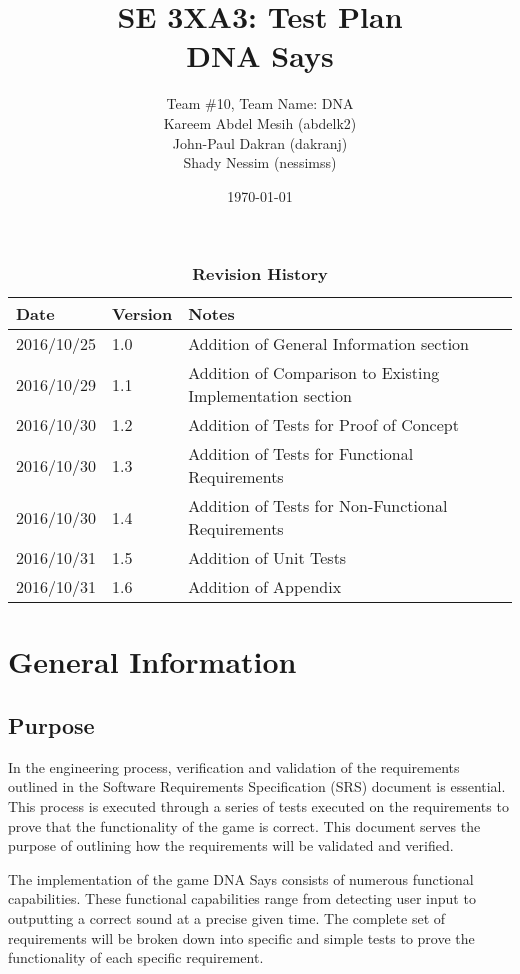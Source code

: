 \documentclass[12pt, titlepage]{article}
\title{SE 3XA3: Test Plan\\DNA Says}
\author{Team \#10, Team Name: DNA
		\\ Kareem Abdel Mesih (abdelk2)
		\\ John-Paul Dakran (dakranj)
		\\ Shady Nessim (nessimss)
}
\date{\today}
\begin{document}
\maketitle
{}
\tableofcontents
\listoftables
\listoffigures
\begin{table}[bp]
\caption{\bf Revision History}
\begin{tabularx}{\textwidth}{p{3cm}p{2cm}X}
\toprule {\bf Date} & {\bf Version} & {\bf Notes}\\
\midrule
2016/10/25 & 1.0 & Addition of General Information section \\
2016/10/29 & 1.1 & Addition of Comparison to Existing Implementation section\\
2016/10/30 & 1.2 & Addition of Tests for Proof of Concept\\
2016/10/30 & 1.3 & Addition of Tests for Functional Requirements\\
2016/10/30 & 1.4 & Addition of Tests for Non-Functional Requirements\\
2016/10/31 & 1.5 & Addition of Unit Tests\\
2016/10/31 & 1.6 & Addition of Appendix\\
\bottomrule
\end{tabularx}
\end{table}
\newpage
{}
\section{General Information}
\subsection{Purpose}

\par In the engineering process, verification and validation of the requirements outlined in the Software Requirements Specification (SRS) document is essential. This process is executed through a series of tests executed on the requirements to prove that the functionality of the game is correct. This document serves the purpose of outlining how the requirements will be validated and verified.
\\
\par The implementation of the game DNA Says consists of numerous functional capabilities. These functional capabilities range from detecting user input to outputting a correct sound at a precise given time. The complete set of requirements will be broken down into specific and simple tests to prove the functionality of each specific requirement. 
\end{document}

